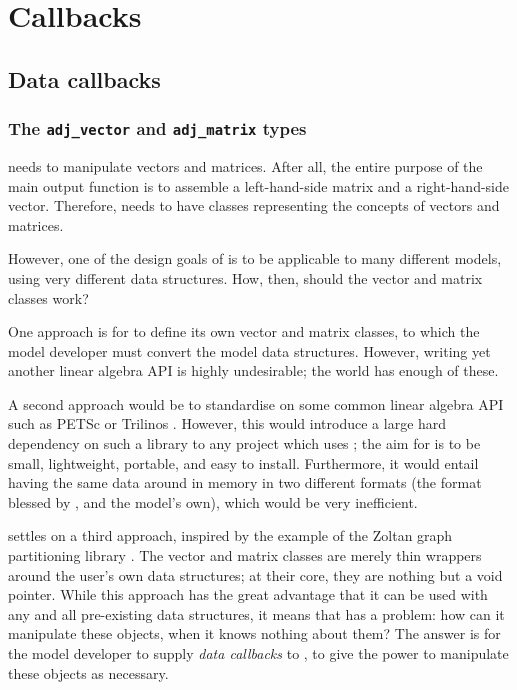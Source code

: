 \chapter{Callbacks} \label{chap:callbacks}
\minitoc
\vspace{\fill}
\newpage

\section{Data callbacks}
\subsection{The \texttt{adj_vector} and \texttt{adj_matrix} types}
\libadjoint needs to manipulate vectors and matrices. After all, the entire
purpose of the main output function  is to
assemble a left-hand-side matrix and a right-hand-side vector. Therefore,
\libadjoint needs to have classes representing the concepts of vectors and matrices.

However, one of the
design goals of \libadjoint is to be applicable to many different models,
using very different data structures. How, then, should the \libadjoint
vector and matrix classes work?

One approach is for \libadjoint to define its own vector and matrix classes,
to which the model developer must convert the model data structures. However,
writing yet another linear algebra API is highly undesirable; the world
has enough of these.

A second approach would be to standardise on some common linear algebra
API such as PETSc \citep{balay1997,balay2010} or Trilinos \citep{heroux2003}. However,
this would introduce a large hard dependency on such a library to any project which uses \libadjoint;
the aim for \libadjoint is to be small, lightweight, portable, and easy to install. Furthermore,
it would entail having the same data around in memory in two different formats (the format blessed by \libadjoint,
and the model's own), which would be very inefficient.

\libadjoint settles on a third approach, inspired by the example of the Zoltan
graph partitioning library \citep{devine2002}. The \libadjoint vector and matrix
classes are merely thin wrappers around the user's own data structures;
at their core, they are nothing but a void pointer. While this approach has the
great advantage that it can be used with any and all pre-existing data structures,
it means that \libadjoint has a problem: how can it manipulate these objects,
when it knows nothing about them? The answer is for the model developer to supply
\emph{data callbacks} to \libadjoint, to give \libadjoint the power to manipulate
these objects as necessary.

